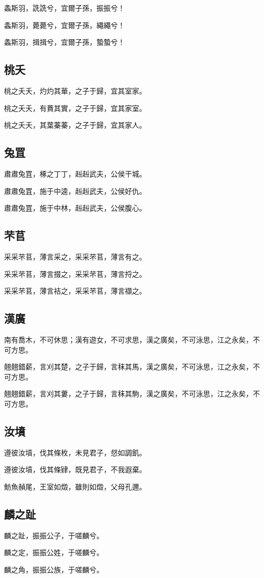 螽斯羽，詵詵兮，宜爾子孫，振振兮！

螽斯羽，薨薨兮，宜爾子孫，繩繩兮！

螽斯羽，揖揖兮，宜爾子孫，蟄蟄兮！

\subsection[桃夭]{桃夭}

桃之夭夭，灼灼其華，之子于歸，宜其室家。

桃之夭夭，有蕡其實，之子于歸，宜其家室。

桃之夭夭，其葉蓁蓁，之子于歸，宜其家人。

\subsection[兔罝]{兔罝}

肅肅兔罝，椓之丁丁，赳赳武夫，公侯干城。

肅肅兔罝，施于中逵，赳赳武夫，公侯好仇。

肅肅兔罝，施于中林，赳赳武夫，公侯腹心。

\subsection[芣苢]{芣苢}

采采芣苢，薄言采之，采采芣苢，薄言有之。

采采芣苢，薄言掇之，采采芣苢，薄言捋之。

采采芣苢，薄言袺之，采采芣苢，薄言襭之。

\subsection[漢廣]{漢廣}

南有喬木，不可休思；漢有遊女，不可求思，漢之廣矣，不可泳思，江之永矣，不可方思。

翹翹錯薪，言刈其楚，之子于歸，言秣其馬，漢之廣矣，不可泳思，江之永矣，不可方思。

翹翹錯薪，言刈其蔞，之子于歸，言秣其駒，漢之廣矣，不可泳思，江之永矣，不可方思。

\subsection[汝墳]{汝墳}

遵彼汝墳，伐其條枚，未見君子，惄如調飢。

遵彼汝墳，伐其條肄，既見君子，不我遐棄。

魴魚赬尾，王室如燬，雖則如燬，父母孔邇。

\subsection[麟之趾]{麟之趾}

麟之趾，振振公子，于嗟麟兮。

麟之定，振振公姓，于嗟麟兮。

麟之角，振振公族，于嗟麟兮。
